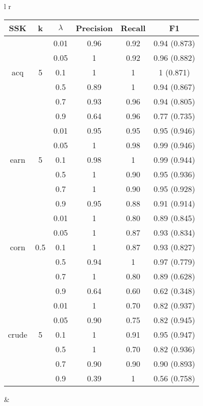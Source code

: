 
\begin{tabular}{l r}
\begin{tabular}{| c | c | c | c | c | c | }
	\hline SSK & k&$ \lambda  $& Precision & Recall & F1   \\ \hline	
	
	&& 0.01 & 0.96 & 0.92 & 0.94  (0.873)   \\ 
	&& 0.05 & 1 & 0.92 & 0.96 (0.882)   \\ 
	acq &5& 0.1 & 1& 1 &  1 (0.871)  \\
	&& 0.5 & 0.89 & 1 & 0.94 (0.867)   \\ 
	&& 0.7 & 0.93 & 0.96 & 0.94 (0.805)    \\ 
	&& 0.9 & 0.64 & 0.96 & 0.77   (0.735)  \\ \hline
	
	
	&& 0.01 & 0.95 & 0.95 &  0.95  (0.946)  \\	
&	& 0.05 & 1 & 0.98 &  0.99  (0.946)  \\ 
	earn&5 & 0.1 & 0.98 & 1 &  0.99  (0.944)  \\ 
	&& 0.5 & 1 & 0.90 &  0.95  (0.936)  \\ 
	&& 0.7 & 1 & 0.90 &  0.95  (0.928)  \\
	&& 0.9 & 0.95 & 0.88 &  0.91  (0.914)  \\\hline
	
	
	
	&& 0.01 & 1 & 0.80 & 0.89  (0.845)   \\ 
	&& 0.05 & 1 & 0.87 & 0.93  (0.834)   \\ 
	corn&0.5 & 0.1 & 1 & 0.87 & 0.93  (0.827)   \\ 
	&& 0.5 & 0.94 & 1 &  0.97 (0.779)  \\ 
	&& 0.7 & 1 & 0.80 & 0.89   (0.628)  \\ 
	&& 0.9 & 0.64 & 0.60 & 0.62  (0.348)   \\ \hline
	
	
	&& 0.01 & 1 & 0.70 &  0.82  (0.937)  \\
	&& 0.05 & 0.90 & 0.75 &  0.82   (0.945) \\ 
	crude&5 & 0.1 & 1 & 0.91 & 0.95 (0.947)    \\ 
	&& 0.5 & 1 & 0.70 &  0.82 (0.936)   \\ 
	&& 0.7 & 0.90 & 0.90 &  0.90  (0.893)  \\
	&& 0.9 & 0.39 & 1 &  0.56  (0.758)  \\\hline
	
	
\end{tabular} &


\end{tabular}
